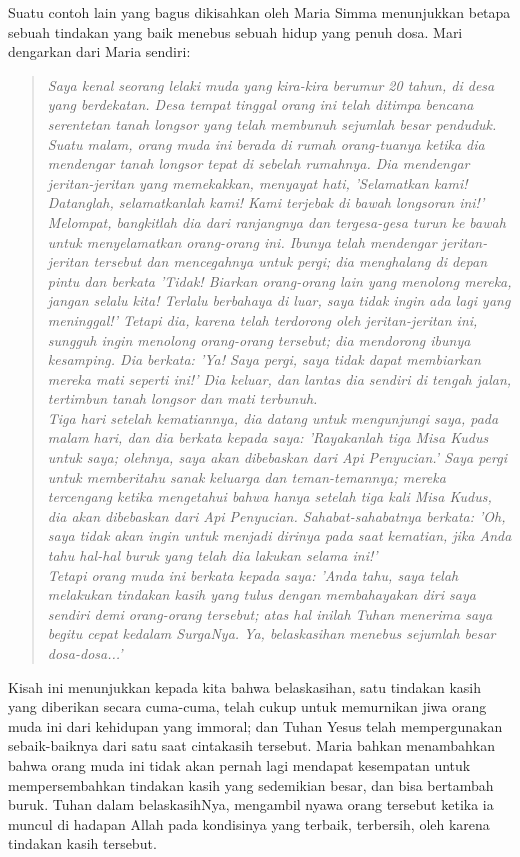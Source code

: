 Suatu contoh lain yang bagus dikisahkan oleh Maria Simma menunjukkan betapa sebuah tindakan yang baik menebus sebuah hidup yang penuh dosa. Mari dengarkan dari Maria sendiri:

\begin{quote}
\textit{Saya kenal seorang lelaki muda yang kira-kira berumur 20 tahun, di desa yang berdekatan. Desa tempat tinggal orang ini telah ditimpa bencana serentetan tanah longsor yang telah membunuh sejumlah besar penduduk. Suatu malam, orang muda ini berada di rumah orang-tuanya ketika dia mendengar tanah longsor tepat di sebelah rumahnya. Dia mendengar jeritan-jeritan yang memekakkan, menyayat hati, 'Selamatkan kami! Datanglah, selamatkanlah kami! Kami terjebak di bawah longsoran ini!'
\\
Melompat, bangkitlah dia dari ranjangnya dan tergesa-gesa turun ke bawah untuk menyelamatkan orang-orang ini. Ibunya telah mendengar jeritan-jeritan tersebut dan mencegahnya untuk pergi; dia menghalang di depan pintu dan berkata 'Tidak! Biarkan orang-orang lain yang menolong mereka, jangan selalu kita! Terlalu berbahaya di luar, saya tidak ingin ada lagi yang meninggal!' 
Tetapi dia, karena telah terdorong oleh jeritan-jeritan ini, sungguh ingin menolong orang-orang tersebut; dia mendorong ibunya kesamping. Dia berkata: 'Ya! Saya pergi, saya tidak dapat membiarkan mereka mati seperti ini!' Dia keluar, dan lantas dia sendiri di tengah jalan, tertimbun tanah longsor dan mati terbunuh.
\\
Tiga hari setelah kematiannya, dia datang untuk mengunjungi saya, pada malam hari, dan dia berkata kepada saya: 'Rayakanlah tiga Misa Kudus untuk saya; olehnya, saya akan dibebaskan dari Api Penyucian.' Saya pergi untuk memberitahu sanak keluarga dan teman-temannya; mereka tercengang ketika mengetahui bahwa hanya setelah tiga kali Misa Kudus, dia akan dibebaskan dari Api Penyucian. Sahabat-sahabatnya berkata: 'Oh, saya tidak akan ingin untuk menjadi dirinya pada saat kematian, jika Anda tahu hal-hal buruk yang telah dia lakukan selama ini!'
\\
Tetapi orang muda ini berkata kepada saya: 'Anda tahu, saya telah melakukan tindakan kasih yang tulus dengan membahayakan diri saya sendiri demi orang-orang tersebut; atas hal inilah Tuhan menerima saya begitu cepat kedalam SurgaNya. Ya, belaskasihan menebus sejumlah besar dosa-dosa...'}
\end{quote}

Kisah ini menunjukkan kepada kita bahwa belaskasihan, satu tindakan kasih yang diberikan secara cuma-cuma, telah cukup untuk memurnikan jiwa orang muda ini dari kehidupan yang immoral; dan Tuhan Yesus telah mempergunakan sebaik-baiknya dari satu saat cintakasih tersebut. Maria bahkan menambahkan bahwa orang muda ini tidak akan pernah lagi mendapat kesempatan untuk mempersembahkan tindakan kasih yang sedemikian besar, dan bisa bertambah buruk. Tuhan dalam belaskasihNya, mengambil nyawa orang tersebut ketika ia muncul di hadapan Allah pada kondisinya yang terbaik, terbersih, oleh karena tindakan kasih tersebut.

